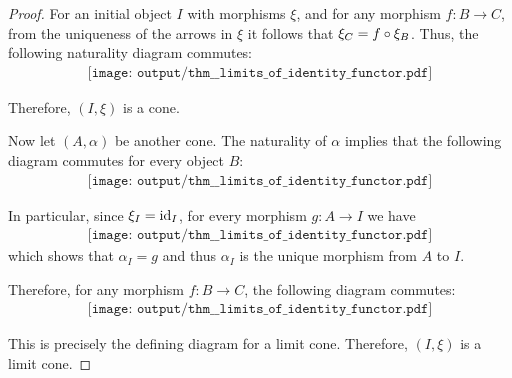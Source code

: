 \begin{proof}
   For an initial object \( I \) with morphisms \( \xi \), and for any morphism \( f: B \to C \), from the uniqueness of the arrows in \( \xi \) it follows that \( \xi_C = f \bincirc \xi_B \). Thus, the following naturality diagram commutes:
  \begin{equation}\label{eq:def:thm:limits_of_identity_functor/initial_object_ks_limit/nat}
    \begin{aligned}
      \texttt{[image: output/thm\_\_limits\_of\_identity\_functor.pdf]}
    \end{aligned}
  \end{equation}

  Therefore, \( (I, \xi) \) is a cone.

  Now let \( (A, \alpha) \) be another cone. The naturality of \( \alpha \) implies that the following diagram commutes for every object \( B \):
  \begin{equation}\label{eq:def:thm:limits_of_identity_functor/initial_object_ks_limit/half_limit}
    \begin{aligned}
      \texttt{[image: output/thm\_\_limits\_of\_identity\_functor.pdf]}
    \end{aligned}
  \end{equation}

  In particular, since \( \xi_I = \operatorname{id}_I \), for every morphism \( g: A \to I \) we have
  \begin{equation}\label{eq:def:thm:limits_of_identity_functor/initial_object_ks_limit/cone_morphism_uniqueness}
    \begin{aligned}
      \texttt{[image: output/thm\_\_limits\_of\_identity\_functor.pdf]}
    \end{aligned}
  \end{equation}
  which shows that \( \alpha_I = g \) and thus \( \alpha_I \) is the unique morphism from \( A \) to \( I \).

  Therefore, for any morphism \( f: B \to C \), the following diagram commutes:
  \begin{equation}\label{eq:def:thm:limits_of_identity_functor/initial_object_ks_limit/limit}
    \begin{aligned}
      \texttt{[image: output/thm\_\_limits\_of\_identity\_functor.pdf]}
    \end{aligned}
  \end{equation}

  This is precisely the defining diagram for a limit cone. Therefore, \( (I, \xi) \) is a limit cone.


\end{proof}
